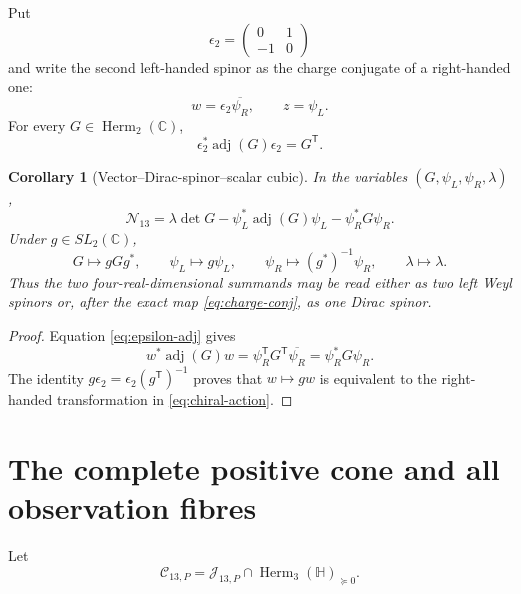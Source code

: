 \documentclass[11pt]{article}
\newtheorem{corollary}[theorem]{Corollary}
\theoremstyle{definition}
\theoremstyle{remark}
\newcommand{\C}{\mathbb C}
\newcommand{\Hh}{\mathbb H}
\newcommand{\Herm}{\operatorname{Herm}}
\newcommand{\adj}{\operatorname{adj}}
\newcommand{\cC}{\mathcal C}
\newcommand{\cJ}{\mathcal J}
\newcommand{\cN}{\mathcal N}
\begin{document}
Put
\begin{equation}\label{eq:epsilon}
 \epsilon_2=\begin{pmatrix}0&1\\-1&0\end{pmatrix}
\end{equation}
and write the second left-handed spinor as the charge conjugate of a right-handed one:
\begin{equation}\label{eq:charge-conj}
 w=\epsilon_2\overline{\psi_R},
 \qquad z=\psi_L.
\end{equation}
For every $G\in\Herm_2(\C)$,
\begin{equation}\label{eq:epsilon-adj}
 \epsilon_2^*\adj(G)\epsilon_2=G^{\mathsf T}.
\end{equation}

\begin{corollary}[Vector--Dirac-spinor--scalar cubic]\label{cor:Dirac}
In the variables $(G,\psi_L,\psi_R,\lambda)$,
\begin{equation}\label{eq:Dirac-cubic}
 \boxed{
 \cN_{13}
 =\lambda\det G
 -\psi_L^*\adj(G)\psi_L
 -\psi_R^*G\psi_R.}
\end{equation}
Under $g\in SL_2(\C)$,
\begin{equation}\label{eq:chiral-action}
 G\mapsto gGg^*,
 \qquad
 \psi_L\mapsto g\psi_L,
 \qquad
 \psi_R\mapsto(g^*)^{-1}\psi_R,
 \qquad
 \lambda\mapsto\lambda.
\end{equation}
Thus the two four-real-dimensional summands may be read either as two left Weyl spinors or, after the exact map \eqref{eq:charge-conj}, as one Dirac spinor.
\end{corollary}

\begin{proof}
Equation \eqref{eq:epsilon-adj} gives
\[
 w^*\adj(G)w
 =\psi_R^{\mathsf T}G^{\mathsf T}\overline{\psi_R}
 =\psi_R^*G\psi_R.
\]
The identity $g\epsilon_2=\epsilon_2(g^{\mathsf T})^{-1}$ proves that $w\mapsto gw$ is equivalent to the right-handed transformation in \eqref{eq:chiral-action}.
\end{proof}

\section{The complete positive cone and all observation fibres}

Let
\begin{equation}\label{eq:C13}
 \cC_{13,P}=\cJ_{13,P}\cap\Herm_3(\Hh)_{\succeq0}.
\end{equation}
\end{document}
